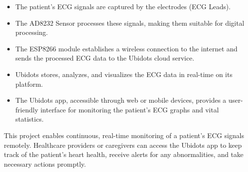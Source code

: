 \begin{itemize}
    \item The patient's ECG signals are captured by the electrodes (ECG Leads).
\end{itemize}
\begin{itemize}
    \item The AD8232 Sensor processes these signals, making them suitable for digital processing.
\end{itemize}
\begin{itemize}
    \item The ESP8266 module establishes a wireless connection to the internet and sends the processed ECG data to the Ubidots cloud service.
\end{itemize}
\begin{itemize}
    \item Ubidots stores, analyzes, and visualizes the ECG data in real-time on its platform.
\end{itemize}
\begin{itemize}
    \item The Ubidots app, accessible through web or mobile devices, provides a user-friendly interface for monitoring the patient's ECG graphs and vital statistics.
\end{itemize}
This project enables continuous, real-time monitoring of a patient's ECG signals remotely. Healthcare providers or caregivers can access the Ubidots app to keep track of the patient's heart health, receive alerts for any abnormalities, and take necessary actions promptly.

